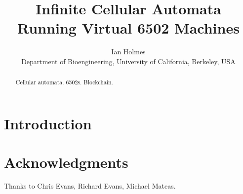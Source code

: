 \documentclass{article}
\begin{document}
\title{Infinite Cellular Automata Running Virtual 6502 Machines}
\author{Ian Holmes \\ Department of Bioengineering, University of California, Berkeley, USA}

\maketitle


\begin{abstract}
  Cellular automata.
  6502s.
  Blockchain.
\end{abstract}

\section{Introduction}

\cite{Nakamoto2008}

\section*{Acknowledgments}
Thanks to Chris Evans, Richard Evans, Michael Mateas.



\end{document}
